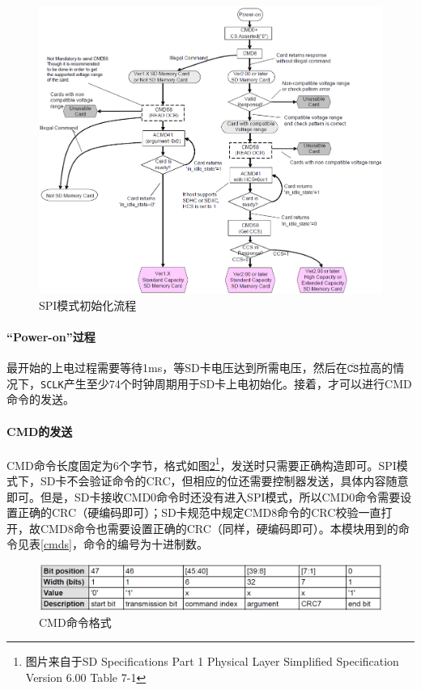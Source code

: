 \documentclass[11pt,utf8]{report}
\begin{document}
	\begin{figure}[h!]
		\centering
		\includegraphics[width=\textwidth]{spi_init}
		\caption{SPI模式初始化流程}
		\label{spi_init}
	\end{figure}
	
	\paragraph{“Power-on”过程} 最开始的上电过程需要等待1ms，等SD卡电压达到所需电压，然后在$\mathtt{\overline{CS}}$拉高的情况下，\texttt{SCLK}产生至少74个时钟周期用于SD卡上电初始化。接着，才可以进行CMD命令的发送。

	\paragraph{CMD的发送} CMD命令长度固定为6个字节，格式如图\ref{cmd}\footnote{图片来自于SD Specifications Part 1 Physical Layer Simplified Specification Version 6.00 Table 7-1}，发送时只需要正确构造即可。SPI模式下，SD卡不会验证命令的CRC，但相应的位还需要控制器发送，具体内容随意即可。但是，SD卡接收CMD0命令时还没有进入SPI模式，所以CMD0命令需要设置正确的CRC（硬编码即可）；SD卡规范中规定CMD8命令的CRC校验一直打开，故CMD8命令也需要设置正确的CRC（同样，硬编码即可）。本模块用到的命令见表\ref{cmds}，命令的编号为十进制数。
	
	\begin{figure}[h!]
		\centering
		\includegraphics[width=\textwidth]{cmd}
		\caption{CMD命令格式}
		\label{cmd}
	\end{figure}
	
\end{document}
